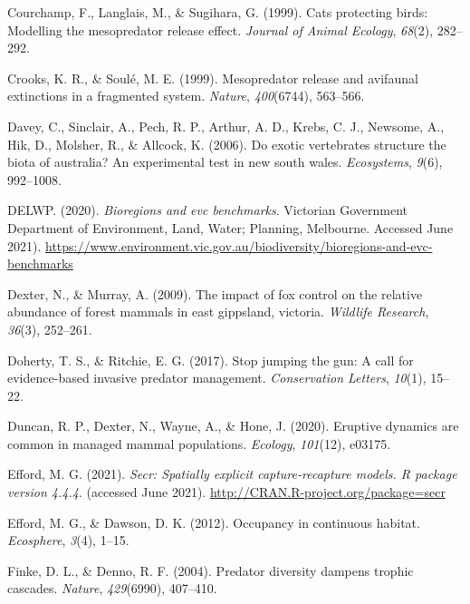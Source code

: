 \documentclass[]{elsarticle} %
\begin{document}
\leavevmode\hypertarget{ref-courchamp1999}{}%
Courchamp, F., Langlais, M., \& Sugihara, G. (1999). Cats protecting birds: Modelling the mesopredator release effect. \emph{Journal of Animal Ecology}, \emph{68}(2), 282--292.

\leavevmode\hypertarget{ref-crooks1999}{}%
Crooks, K. R., \& Soulé, M. E. (1999). Mesopredator release and avifaunal extinctions in a fragmented system. \emph{Nature}, \emph{400}(6744), 563--566.

\leavevmode\hypertarget{ref-davey2006}{}%
Davey, C., Sinclair, A., Pech, R. P., Arthur, A. D., Krebs, C. J., Newsome, A., Hik, D., Molsher, R., \& Allcock, K. (2006). Do exotic vertebrates structure the biota of australia? An experimental test in new south wales. \emph{Ecosystems}, \emph{9}(6), 992--1008.

\leavevmode\hypertarget{ref-delwp2020}{}%
DELWP. (2020). \emph{Bioregions and evc benchmarks}. Victorian Government Department of Environment, Land, Water; Planning, Melbourne. Accessed June 2021). \url{https://www.environment.vic.gov.au/biodiversity/bioregions-and-evc-benchmarks}

\leavevmode\hypertarget{ref-dexter2009impact}{}%
Dexter, N., \& Murray, A. (2009). The impact of fox control on the relative abundance of forest mammals in east gippsland, victoria. \emph{Wildlife Research}, \emph{36}(3), 252--261.

\leavevmode\hypertarget{ref-doherty2017}{}%
Doherty, T. S., \& Ritchie, E. G. (2017). Stop jumping the gun: A call for evidence-based invasive predator management. \emph{Conservation Letters}, \emph{10}(1), 15--22.

\leavevmode\hypertarget{ref-duncan2020eruptive}{}%
Duncan, R. P., Dexter, N., Wayne, A., \& Hone, J. (2020). Eruptive dynamics are common in managed mammal populations. \emph{Ecology}, \emph{101}(12), e03175.

\leavevmode\hypertarget{ref-efford2021secr}{}%
Efford, M. G. (2021). \emph{Secr: Spatially explicit capture-recapture models. R package version 4.4.4}. (accessed June 2021). \url{http://CRAN.R-project.org/package=secr}

\leavevmode\hypertarget{ref-efford2012}{}%
Efford, M. G., \& Dawson, D. K. (2012). Occupancy in continuous habitat. \emph{Ecosphere}, \emph{3}(4), 1--15.

\leavevmode\hypertarget{ref-finke2004}{}%
Finke, D. L., \& Denno, R. F. (2004). Predator diversity dampens trophic cascades. \emph{Nature}, \emph{429}(6990), 407--410.
\end{document}
